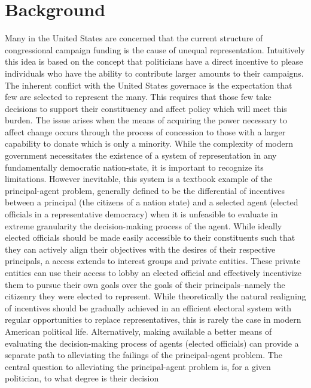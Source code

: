 \documentclass[journal]{IEEEtran}
\begin{document}
\IEEEpeerreviewmaketitle



\section{Background}
Many in the United States are concerned that the current structure of congressional campaign funding is the cause of 
unequal representation. Intuitively this idea is based on the concept that politicians have a direct incentive to please
individuals who have the ability to contribute larger amounts to their campaigns. The inherent conflict with the United States governace is the expectation that few are selected
to represent the many. This requires that those few take decisions to support their constituency and affect policy which
will meet this burden. The issue arises when the means of acquiring the power necessary to affect change occurs through 
the process of concession to those with a larger capability to donate which is only a minority.
While the complexity of modern government necessitates the existence of a system of representation in any fundamentally 
democratic nation-state, it is important to recognize its limitations. However inevitable, this system is a textbook 
example of the principal-agent problem, generally defined to be the differential of incentives between a principal (the 
citizens of a nation state) and a selected agent (elected officials in a representative democracy) when it is unfeasible 
to evaluate in extreme granularity the decision-making process of the agent. While ideally elected officials should be 
made easily accessible to their constituents such that they can actively align their objectives with the desires of their 
respective principals, a access extends to interest groups and private entities. These private entities can use their 
access to lobby an elected official and effectively incentivize them to pursue their own goals over the goals of their 
principals--namely the citizenry they were elected to represent. While theoretically the natural realigning of incentives 
should be gradually achieved in an efficient electoral system with regular opportunities to replace representatives, this 
is rarely the case in modern American political life. Alternatively, making available a better means of evaluating the 
decision-making process of agents (elected officials) can provide a separate path to alleviating the failings of the 
principal-agent problem.\newline
  The central question to alleviating the principal-agent problem is, for a given politician, to what degree is their decision 
\end{document}

